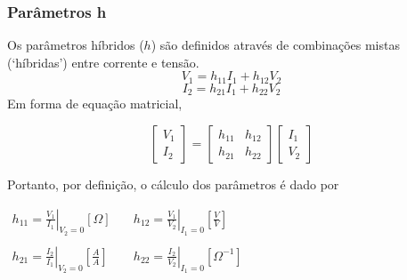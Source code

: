 \documentclass{article}
\numberwithin{equation}{section}
\begin{document}
    \subsubsection{Parâmetros h}
    \label{subsubsec:quadripolosh}
    Os parâmetros híbridos ($h$) são definidos através de combinações mistas (`híbridas') entre corrente e tensão.
    \begin{equation*}
        V_{1}=h_{11}I_{1}+h_{12}V_{2}
    \end{equation*}
    \begin{equation*}
        I_{2}=h_{21}I_{1}+h_{22}V_{2}
    \end{equation*}
    Em forma de equação matricial,

    \begin{equation}
        \begin{bmatrix}
            V_{1} \\
            I_{2}
        \end{bmatrix}
        = %
        \begin{bmatrix}
            h_{11} & h_{12} \\
            h_{21} & h_{22}
        \end{bmatrix}
        \begin{bmatrix}
            I_{1} \\
            V_{2}
        \end{bmatrix}
    \end{equation}

    Portanto, por definição, o cálculo dos parâmetros é dado por
    \begin{center}
        $\begin{matrix} %
                h_{11}=\displaystyle\left.\frac{V_{1}}{I_{1}}\right|_{V_{2}=0} [\Omega] &\quad h_{12}=\displaystyle\left.\frac{V_{1}}{V_{2}}\right|_{I_{1}=0}\left[\frac{V}{V}\right]\\\\
                h_{21}=\displaystyle\left.\frac{I_{2}}{I_{1}}\right|_{V_{2}=0}\left[\frac{A}{A}\right]&\quad
                h_{22}=\displaystyle\left.\frac{I_{2}}{V_{2}}\right|_{I_{1}=0} [\Omega^{-1}]
        \end{matrix}$
    \end{center}
\end{document}
